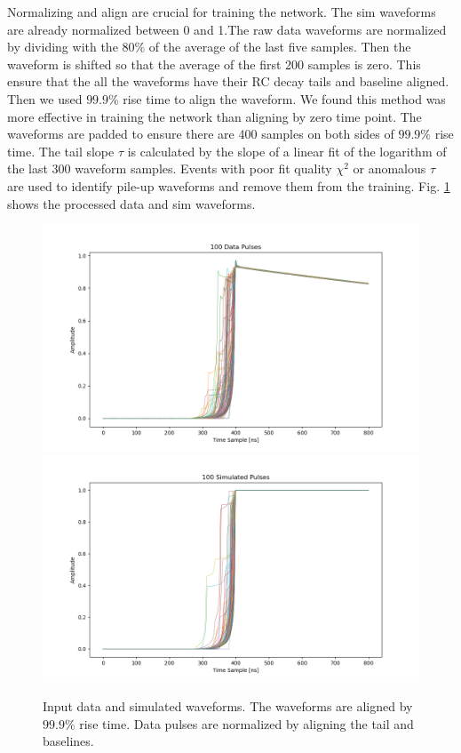 Normalizing and align are crucial for training the network. The sim waveforms are already normalized between 0 and 1.The raw data waveforms are normalized by dividing with the $80\%$ of the average of the last five samples. Then the waveform is shifted so that the average of the first 200 samples is zero. This ensure that the all the waveforms have their RC decay tails and baseline aligned. Then we used $99.9\%$ rise time to align the waveform. We found this method was more effective in training the network than aligning by zero time point. The waveforms are padded to ensure there are 400 samples on both sides of $99.9\%$ rise time. The tail slope $\tau$ is calculated by the slope of a linear fit of the logarithm of the last 300 waveform samples. Events with poor fit quality $\chi^2$ or anomalous $\tau$ are used to identify pile-up waveforms and remove them from the training. Fig. \ref{ch7:figs:in_out} shows the processed data and sim waveforms.

\begin{figure}[!htb]
    \includegraphics[width=0.99\linewidth,trim={0pc 0pc 0pc 0pc},clip]{ch7/figs/all_data_pulses.png}
    \includegraphics[width=0.99\linewidth,trim={0pc 0pc 0pc 0pc},clip]{ch7/figs/all_simulated_pulses.png}
    \caption{Input data and simulated waveforms. The waveforms are aligned by $99.9\%$ rise time. Data pulses are normalized by aligning the tail and baselines.}
   \label{ch7:figs:in_out}
\end{figure}


